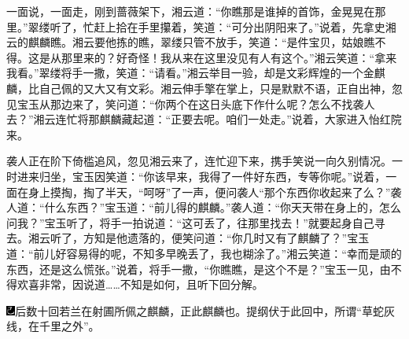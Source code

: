 一面说，一面走，刚到蔷薇架下，湘云道：``你瞧那是谁掉的首饰，金晃晃在那里。''翠缕听了，忙赶上拾在手里攥着，笑道：``可分出阴阳来了。''说着，先拿史湘云的麒麟瞧。湘云要他拣的瞧，翠缕只管不放手，笑道：``是件宝贝，姑娘瞧不得。这是从那里来的？好奇怪！我从来在这里没见有人有这个。''湘云笑道：``拿来我看。''翠缕将手一撒，笑道：``请看。''湘云举目一验，却是文彩辉煌的一个金麒麟，比自己佩的又大又有文彩。湘云伸手擎在掌上，只是默默不语，正自出神，忽见宝玉从那边来了，笑问道：``你两个在这日头底下作什么呢？怎么不找袭人去？''湘云连忙将那麒麟藏起道：``正要去呢。咱们一处走。''说着，大家进入怡红院来。

袭人正在阶下倚槛追风，忽见湘云来了，连忙迎下来，携手笑说一向久别情况。一时进来归坐，宝玉因笑道：``你该早来，我得了一件好东西，专等你呢。''说着，一面在身上摸掏，掏了半天，``呵呀''了一声，便问袭人``那个东西你收起来了么？''袭人道：``什么东西？''宝玉道：``前儿得的麒麟。''袭人道：``你天天带在身上的，怎么问我？''宝玉听了，将手一拍说道：``这可丢了，往那里找去！''就要起身自己寻去。湘云听了，方知是他遗落的，便笑问道：``你几时又有了麒麟了？''宝玉道：``前儿好容易得的呢，不知多早晚丢了，我也糊涂了。''湘云笑道：``幸而是顽的东西，还是这么慌张。''说着，将手一撒，``你瞧瞧，是这个不是？''宝玉一见，由不得欢喜非常，因说道\ldots{}\ldots{}不知是如何，且听下回分解。

{\includegraphics[width=3mm]{../Images/00003}后数十回若兰在射圃所佩之麒麟，正此麒麟也。提纲伏于此回中，所谓``草蛇灰线，在千里之外''。}
